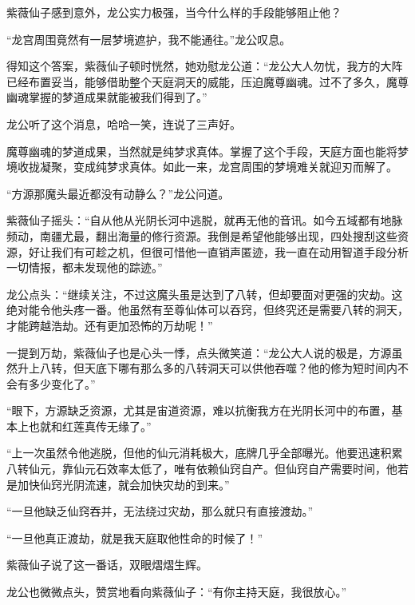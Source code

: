 \begin{this_body}
紫薇仙子感到意外，龙公实力极强，当今什么样的手段能够阻止他？

“龙宫周围竟然有一层梦境遮护，我不能通往。”龙公叹息。

得知这个答案，紫薇仙子顿时恍然，她劝慰龙公道：“龙公大人勿忧，我方的大阵已经布置妥当，能够借助整个天庭洞天的威能，压迫魔尊幽魂。过不了多久，魔尊幽魂掌握的梦道成果就能被我们得到了。”

龙公听了这个消息，哈哈一笑，连说了三声好。

魔尊幽魂的梦道成果，当然就是纯梦求真体。掌握了这个手段，天庭方面也能将梦境收拢凝聚，变成纯梦求真体。如此一来，龙宫周围的梦境难关就迎刃而解了。

“方源那魔头最近都没有动静么？”龙公问道。

紫薇仙子摇头：“自从他从光阴长河中逃脱，就再无他的音讯。如今五域都有地脉频动，南疆尤最，翻出海量的修行资源。我倒是希望他能够出现，四处搜刮这些资源，好让我们有可趁之机，但很可惜他一直销声匿迹，我一直在动用智道手段分析一切情报，都未发现他的踪迹。”

龙公点头：“继续关注，不过这魔头虽是达到了八转，但却要面对更强的灾劫。这绝对能令他头疼一番。他虽然有至尊仙体可以吞窍，但终究还是需要八转的洞天，才能跨越浩劫。还有更加恐怖的万劫呢！”

一提到万劫，紫薇仙子也是心头一悸，点头微笑道：“龙公大人说的极是，方源虽然升上八转，但天底下哪有那么多的八转洞天可以供他吞噬？他的修为短时间内不会有多少变化了。”

“眼下，方源缺乏资源，尤其是宙道资源，难以抗衡我方在光阴长河中的布置，基本上也就和红莲真传无缘了。”

“上一次虽然令他逃脱，但他的仙元消耗极大，底牌几乎全部曝光。他要迅速积累八转仙元，靠仙元石效率太低了，唯有依赖仙窍自产。但仙窍自产需要时间，他若是加快仙窍光阴流速，就会加快灾劫的到来。”

“一旦他缺乏仙窍吞并，无法绕过灾劫，那么就只有直接渡劫。”

“一旦他真正渡劫，就是我天庭取他性命的时候了！”

紫薇仙子说了这一番话，双眼熠熠生辉。

龙公也微微点头，赞赏地看向紫薇仙子：“有你主持天庭，我很放心。”

\end{this_body}

